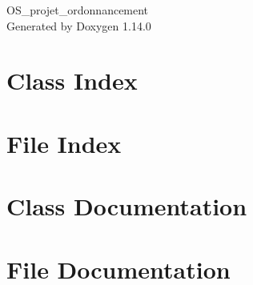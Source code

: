 \documentclass[twoside]{book}
\newcommand{\+}{\discretionary{\mbox{\scriptsize$\hookleftarrow$}}{}{}}
\newcommand{\clearemptydoublepage}{%
    \newpage{\pagestyle{empty}\cleardoublepage}%
  }
\begin{document}
  \raggedbottom
  \begin{titlepage}
  \vspace*{7cm}
  \begin{center}%
  {\Large OS\+\_\+projet\+\_\+ordonnancement}\\
  \vspace*{1cm}
  {\large Generated by Doxygen 1.14.0}\\
  \end{center}
  \end{titlepage}
  \clearemptydoublepage
  \tableofcontents
  \clearemptydoublepage
\chapter{Class Index}

\chapter{File Index}

\chapter{Class Documentation}



\chapter{File Documentation}






















  \backmatter
  \newpage
  \clearemptydoublepage
  \printindex
\end{document}
